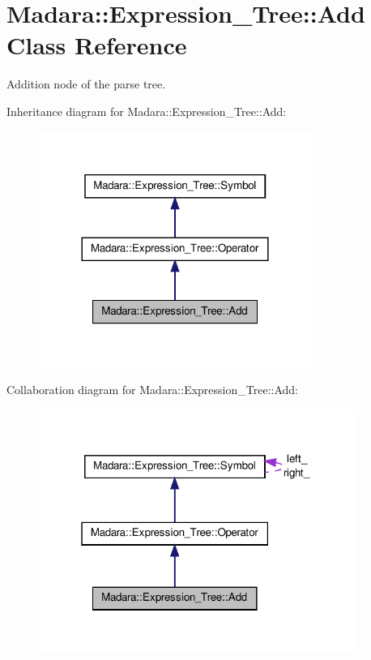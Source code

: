 \hypertarget{classMadara_1_1Expression__Tree_1_1Add}{
\section{Madara::Expression\_\-Tree::Add Class Reference}
\label{da/d05/classMadara_1_1Expression__Tree_1_1Add}
}


Addition node of the parse tree.  




Inheritance diagram for Madara::Expression\_\-Tree::Add:
\nopagebreak
\begin{figure}[H]
\begin{center}
\leavevmode
\includegraphics[width=252pt]{da/d55/classMadara_1_1Expression__Tree_1_1Add__inherit__graph}
\end{center}
\end{figure}


Collaboration diagram for Madara::Expression\_\-Tree::Add:
\nopagebreak
\begin{figure}[H]
\begin{center}
\leavevmode
\includegraphics[width=292pt]{d9/daf/classMadara_1_1Expression__Tree_1_1Add__coll__graph}
\end{center}
\end{figure}
